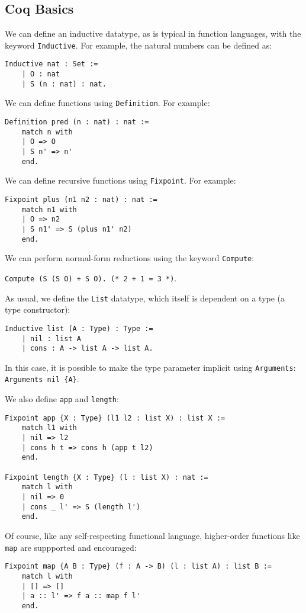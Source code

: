 \subsection{Coq Basics}
We can define an inductive datatype, as is typical in function languages, with the keyword \lstinline{Inductive}.
For example, the natural numbers can be defined as:
\begin{lstlisting}
Inductive nat : Set :=
	| O : nat
	| S (n : nat) : nat.
\end{lstlisting}
We can define functions using \lstinline{Definition}. For example:
\begin{lstlisting}
Definition pred (n : nat) : nat :=
	match n with
	| O => O
	| S n' => n'
	end.
\end{lstlisting}
We can define recursive functions using \lstinline{Fixpoint}. For example:
\begin{lstlisting}
Fixpoint plus (n1 n2 : nat) : nat :=
	match n1 with
	| O => n2
	| S n1' => S (plus n1' n2)
	end.
\end{lstlisting}

We can perform normal-form reductions using the keyword \lstinline{Compute}: 

\lstinline{Compute (S (S O) + S O). (* 2 + 1 = 3 *)}.

As usual, we define the \lstinline{List} datatype, which itself is dependent on a type (a type constructor):
\begin{lstlisting}
Inductive list (A : Type) : Type :=
    | nil : list A
    | cons : A -> list A -> list A.
\end{lstlisting}

In this case, it is possible to make the type parameter implicit using \lstinline{Arguments}: \lstinline|Arguments nil {A}|.

We also define \lstinline{app} and \lstinline{length}:
\begin{lstlisting}
Fixpoint app {X : Type} (l1 l2 : list X) : list X :=
	match l1 with
	| nil => l2
	| cons h t => cons h (app t l2)
	end.

Fixpoint length {X : Type} (l : list X) : nat :=
	match l with
	| nil => 0
	| cons _ l' => S (length l')
	end.
\end{lstlisting}

Of course, like any self-respecting functional language, higher-order functions like \lstinline{map} are suppported and 
encouraged:
\begin{lstlisting}
Fixpoint map {A B : Type} (f : A -> B) (l : list A) : list B :=
	match l with
	| [] => []
	| a :: l' => f a :: map f l'
	end.
\end{lstlisting}

